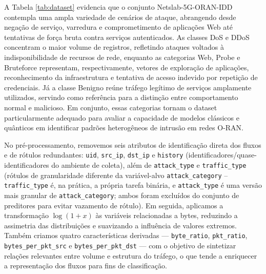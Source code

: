 \documentclass[12pt]{article}
\begin{document}
A Tabela \ref{tab:dataset} evidencia que o conjunto Netslab-5G-ORAN-IDD contempla uma ampla variedade de cenários de ataque, abrangendo desde negação de serviço, varredura e comprometimento de aplicações Web até tentativas de força bruta contra serviços autenticados. As classes DoS e DDoS concentram o maior volume de registros, refletindo ataques voltados à indisponibilidade de recursos de rede, enquanto as categorias Web, Probe e Bruteforce representam, respectivamente, vetores de exploração de aplicações, reconhecimento da infraestrutura e tentativa de acesso indevido por repetição de credenciais. Já a classe Benigno reúne tráfego legítimo de serviços amplamente utilizados, servindo como referência para a distinção entre comportamento normal e malicioso. Em conjunto, essas categorias tornam o dataset particularmente adequado para avaliar a capacidade de modelos clássicos e quânticos em identificar padrões heterogêneos de intrusão em redes O-RAN.




No pré-processamento, removemos seis atributos de identificação direta dos fluxos e de rótulos redundantes: \texttt{uid}, \texttt{src\_ip}, \texttt{dst\_ip} e \texttt{history} (identificadores/quase-identificadores do ambiente de coleta), além de \texttt{attack\_type} e \texttt{traffic\_type} (rótulos de granularidade diferente da variável-alvo \texttt{attack\_category} -- \texttt{traffic\_type} é, na prática, a própria tarefa binária, e \texttt{attack\_type} é uma versão mais granular de \texttt{attack\_category}; ambos foram excluídos do conjunto de preditores para evitar vazamento de rótulo). Em seguida, aplicamos a transformação
$\log(1+x)$ às variáveis relacionadas a bytes, reduzindo a assimetria das distribuições e suavizando a influência de valores extremos. Também criamos quatro características derivadas — \texttt{byte\_ratio}, \texttt{pkt\_ratio}, \texttt{bytes\_per\_pkt\_src} e \texttt{bytes\_per\_pkt\_dst} — com o objetivo de sintetizar relações relevantes entre volume e estrutura do tráfego, o que tende a enriquecer a representação dos fluxos para fins de classificação.
\end{document}

